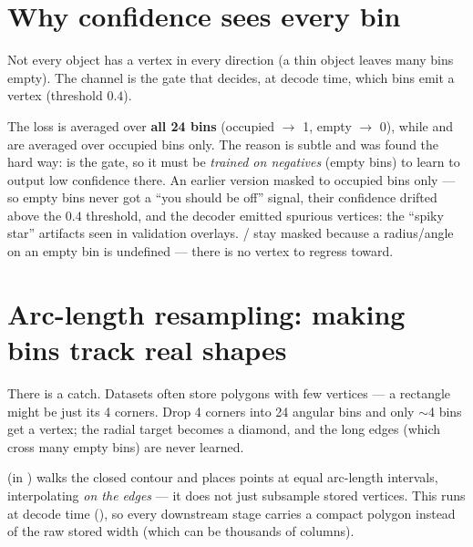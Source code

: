 \section{Why confidence sees every bin}
Not every object has a vertex in every direction (a thin object leaves many bins empty).
The  channel is the gate that decides, at decode time, which bins emit a vertex
(threshold $0.4$).

\begin{why}
The  loss is averaged over \textbf{all 24 bins} (occupied $\rightarrow$ 1, empty
$\rightarrow$ 0), while  and  are averaged over occupied bins only.
The reason is subtle and was found the hard way:  is the gate, so it must be
\emph{trained on negatives} (empty bins) to learn to output low confidence there. An
earlier version masked  to occupied bins only --- so empty bins never got a
``you should be off'' signal, their confidence drifted above the $0.4$ threshold, and the
decoder emitted spurious vertices: the ``spiky star'' artifacts seen in validation
overlays. / stay masked because a radius/angle on an empty bin is
undefined --- there is no vertex to regress toward.
\end{why}

\section{Arc-length resampling: making bins track real shapes}
There is a catch. Datasets often store polygons with few vertices --- a rectangle might be
just its 4 corners. Drop 4 corners into 24 angular bins and only $\sim$4 bins get a
vertex; the radial target becomes a diamond, and the long edges (which cross many empty
bins) are never learned.


\begin{hood}
 (in ) walks the closed
contour and places  points at equal arc-length intervals, interpolating
\emph{on the edges} --- it does not just subsample stored vertices. This runs at decode
time (), so every downstream stage carries a compact
\code{[N, 128]} polygon instead of the raw stored width (which can be thousands of
columns).
\end{hood}

